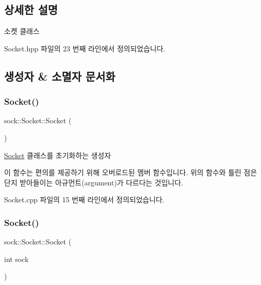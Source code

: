 \subsection{상세한 설명}
소켓 클래스 

Socket.\+hpp 파일의 23 번째 라인에서 정의되었습니다.



\subsection{생성자 \& 소멸자 문서화}
\mbox{\label{classsock_1_1_socket_a9983ebd97b8f79d3e4c67fca05811dcb}} 
\subsubsection{\texorpdfstring{Socket()}{Socket()}\hspace{0.1cm}{\footnotesize\ttfamily [1/2]}}
{\footnotesize\ttfamily sock\+::\+Socket\+::\+Socket (\begin{DoxyParamCaption}{ }\end{DoxyParamCaption})}



\hyperlink{classsock_1_1_socket}{Socket} 클래스를 초기화하는 생성자 

이 함수는 편의를 제공하기 위해 오버로드된 멤버 함수입니다. 위의 함수와 틀린 점은 단지 받아들이는 아규먼트(argument)가 다르다는 것입니다. 

Socket.\+cpp 파일의 15 번째 라인에서 정의되었습니다.

\mbox{\label{classsock_1_1_socket_a570a3285956f8923f490f9203a6d1d8f}} 
\subsubsection{\texorpdfstring{Socket()}{Socket()}\hspace{0.1cm}{\footnotesize\ttfamily [2/2]}}
{\footnotesize\ttfamily sock\+::\+Socket\+::\+Socket (\begin{DoxyParamCaption}\item[{int}]{sock }\end{DoxyParamCaption})}



